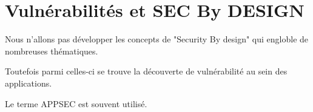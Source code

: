 
\section{Vulnérabilités et SEC By DESIGN}

Nous n'allons pas développer les concepts de "Security By design" qui  engloble de nombreuses thématiques.

Toutefois parmi celles-ci se trouve la découverte de vulnérabilité au sein des applications.

Le terme APPSEC est souvent utilisé.  

